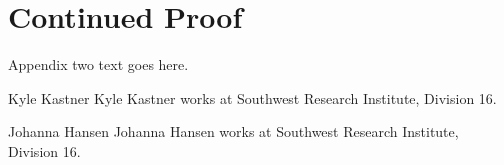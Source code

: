 \documentclass[journal]{IEEEtran}
\begin{document}
\section{Continued Proof}
Appendix two text goes here.


\begin{IEEEbiographynophoto}{Kyle Kastner}
Kyle Kastner works at Southwest Research Institute, Division 16.
\end{IEEEbiographynophoto}

\begin{IEEEbiographynophoto}{Johanna Hansen}
Johanna Hansen works at Southwest Research Institute, Division 16.
\end{IEEEbiographynophoto}




\end{document}
